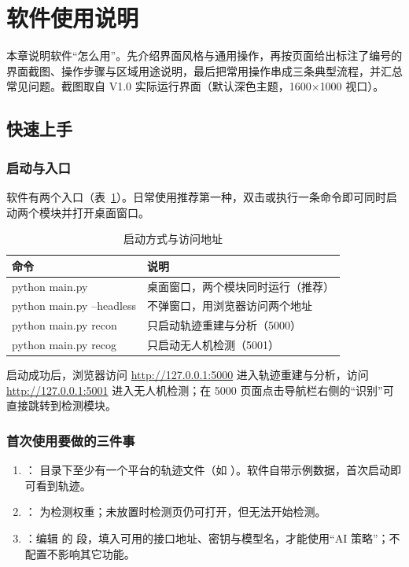 \section{软件使用说明}

本章说明软件“怎么用”。先介绍界面风格与通用操作，再按页面给出标注了编号的界面截图、操作步骤与区域用途说明，最后把常用操作串成三条典型流程，并汇总常见问题。截图取自 V1.0 实际运行界面（默认深色主题，1600$\times$1000 视口）。

\subsection{快速上手}

\subsubsection{启动与入口}

软件有两个入口（表~\ref{tab:use_entry}）。日常使用推荐第一种，双击或执行一条命令即可同时启动两个模块并打开桌面窗口。

\begin{table}[H]
\centering
\caption{启动方式与访问地址}
\label{tab:use_entry}
\small
\begin{tabularx}{\linewidth}{@{}>{\ttfamily}p{4.4cm}>{\raggedright\arraybackslash}X@{}}
\toprule
命令 & 说明 \\
\midrule
python main.py & 桌面窗口，两个模块同时运行（推荐） \\
python main.py --headless & 不弹窗口，用浏览器访问两个地址 \\
python main.py recon & 只启动轨迹重建与分析（5000） \\
python main.py recog & 只启动无人机检测（5001） \\
\bottomrule
\end{tabularx}
\end{table}

启动成功后，浏览器访问 \url{http://127.0.0.1:5000} 进入轨迹重建与分析，访问 \url{http://127.0.0.1:5001} 进入无人机检测；在 5000 页面点击导航栏右侧的“识别”可直接跳转到检测模块。

\subsubsection{首次使用要做的三件事}

\begin{enumerate}
  \item {}： 目录下至少有一个平台的轨迹文件（如 ）。软件自带示例数据，首次启动即可看到轨迹。
  \item {}： 为检测权重；未放置时检测页仍可打开，但无法开始检测。
  \item {}：编辑  的  段，填入可用的接口地址、密钥与模型名，才能使用“AI 策略”；不配置不影响其它功能。
\end{enumerate}

